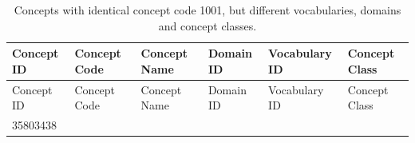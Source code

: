 \documentclass[11pt]{book}
\theoremstyle{definition}
\theoremstyle{definition}
\theoremstyle{definition}
\theoremstyle{remark}
\begin{document}
\begin{longtable}[]{@{}llllll@{}}
\caption{\label{tab:code1001} Concepts with identical concept code 1001, but
different vocabularies, domains and concept classes.}\tabularnewline
\toprule
\begin{minipage}[b]{0.13\columnwidth}\raggedright\strut
Concept ID\strut
\end{minipage} & \begin{minipage}[b]{0.07\columnwidth}\raggedright\strut
Concept Code\strut
\end{minipage} & \begin{minipage}[b]{0.16\columnwidth}\raggedright\strut
Concept Name\strut
\end{minipage} & \begin{minipage}[b]{0.14\columnwidth}\raggedright\strut
Domain ID\strut
\end{minipage} & \begin{minipage}[b]{0.14\columnwidth}\raggedright\strut
Vocabulary ID\strut
\end{minipage} & \begin{minipage}[b]{0.14\columnwidth}\raggedright\strut
Concept Class\strut
\end{minipage}\tabularnewline
\midrule
\endfirsthead
\toprule
\begin{minipage}[b]{0.13\columnwidth}\raggedright\strut
Concept ID\strut
\end{minipage} & \begin{minipage}[b]{0.07\columnwidth}\raggedright\strut
Concept Code\strut
\end{minipage} & \begin{minipage}[b]{0.16\columnwidth}\raggedright\strut
Concept Name\strut
\end{minipage} & \begin{minipage}[b]{0.14\columnwidth}\raggedright\strut
Domain ID\strut
\end{minipage} & \begin{minipage}[b]{0.14\columnwidth}\raggedright\strut
Vocabulary ID\strut
\end{minipage} & \begin{minipage}[b]{0.14\columnwidth}\raggedright\strut
Concept Class\strut
\end{minipage}\tabularnewline
\midrule
\endhead
\begin{minipage}[t]{0.13\columnwidth}\raggedright\strut
35803438\strut
\end{minipage} & \begin{minipage}[t]{0.07\columnwidth}\raggedright\strut

\end{minipage}
\end{longtable}
\end{document}
